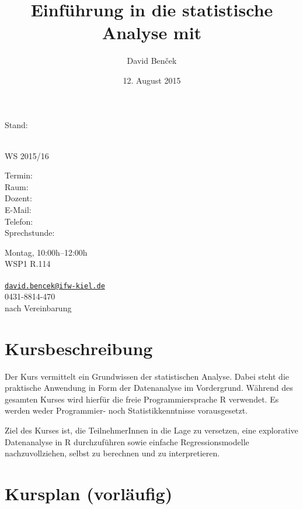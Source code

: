 \documentclass[]{article}
\title{Einführung in die statistische Analyse mit \R{}}
\author{David Benček}
\date{12. August 2015}
\makeatletter
\renewcommand{\[}{\begin{equation}}
\renewcommand{\]}{\end{equation}}
\newcommand{\R}{\textsf{R}}
\renewcommand\maketitle{%
 \null\hfill Stand: \@date\vspace{0.5cm}
 {\bfseries
  \begin{center}
      {\Large \@title}\\
      {{\mdseries WS 2015/16}}
  \end{center}
  \begin{minipage}[t][][t]{0.23\linewidth}
			Termin:\\
			Raum:\\
			Dozent:\\
			E-Mail:\\
			Telefon:\\
			Sprechstunde:\\
		\end{minipage}
		\begin{minipage}[t][][t]{0.7\linewidth}
			Montag, 10:00h--12:00h\\
			WSP1 R.114\\
			\@author\\
			\href{mailto:david.bencek@ifw-kiel.de}{\nolinkurl{david.bencek@ifw-kiel.de}}\\
			0431-8814-470\\
			nach Vereinbarung\\
		\end{minipage}
 }
 
}
\makeatother
\begin{document}
\maketitle






\section{Kursbeschreibung}\label{kursbeschreibung}

Der Kurs vermittelt ein Grundwissen der statistischen Analyse. Dabei
steht die praktische Anwendung in Form der Datenanalyse im Vordergrund.
Während des gesamten Kurses wird hierfür die freie Programmiersprache
\R{} verwendet. Es werden weder Programmier- noch Statistikkenntnisse
vorausgesetzt.

Ziel des Kurses ist, die TeilnehmerInnen in die Lage zu versetzen, eine
explorative Datenanalyse in \R{} durchzuführen sowie einfache
Regressionsmodelle nachzuvollziehen, selbst zu berechnen und zu
interpretieren.

\section{Kursplan (vorläufig)}\label{kursplan-vorlaufig}
\end{document}
